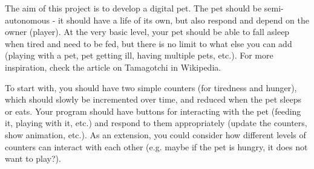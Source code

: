 The aim of this project is to develop a digital pet. The pet should be 
semi-autonomous - it should have a life of its own, but also respond 
and depend on the owner (player). At the very basic level, your pet should 
be able to fall asleep when tired and need to be fed, but there is no limit 
to what else you can add (playing with a pet, pet getting 
ill, having multiple pets, etc.). For more inspiration, check the article 
on Tamagotchi in Wikipedia.

To start with, you should have two simple counters (for tiredness and hunger),
which should slowly be incremented over time, and reduced when the pet 
sleeps or eats. Your program should have buttons for interacting with the 
pet (feeding it, playing with it, etc.) and respond to them appropriately 
(update the counters, show animation, etc.). As an extension, you could 
consider how different levels of counters can interact with each other 
(e.g. maybe if the pet is hungry, it does not want to play?).
